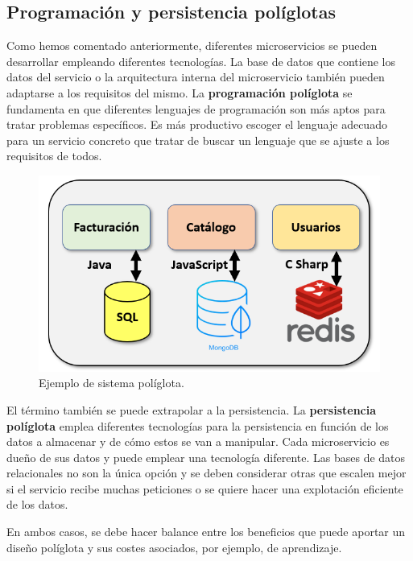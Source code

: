 \documentclass[11pt,spanish,listoffigures,listoftables]{tfgetsinf}
\begin{document}
\subsection{Programación y persistencia políglotas}

Como hemos comentado anteriormente, diferentes microservicios se pueden desarrollar empleando diferentes tecnologías. La base de datos que contiene los datos del servicio o la arquitectura interna del microservicio también pueden adaptarse a los requisitos del mismo. \cite{DelaTorre2018} La \textbf{programación políglota} se fundamenta en que diferentes lenguajes de programación son más aptos para tratar problemas específicos. Es más productivo escoger el lenguaje adecuado para un servicio concreto que tratar de buscar un lenguaje que se ajuste a los requisitos de todos.

\begin{figure}[h]
\centering
\includegraphics[scale=0.65]{poliglota}
\caption{Ejemplo de sistema políglota.}
\end{figure}

El término también se puede extrapolar a la persistencia. La \textbf{persistencia políglota} emplea diferentes tecnologías para la persistencia en función de los datos a almacenar y de cómo estos se van a manipular. Cada microservicio es dueño de sus datos y puede emplear una tecnología diferente. Las bases de datos relacionales no son la única opción y se deben considerar otras que escalen mejor si el servicio recibe muchas peticiones o se quiere hacer una explotación eficiente de los datos. \cite{Fowler2011}

En ambos casos, se debe hacer balance entre los beneficios que puede aportar un diseño políglota y sus costes asociados, por ejemplo, de aprendizaje.
\end{document}
